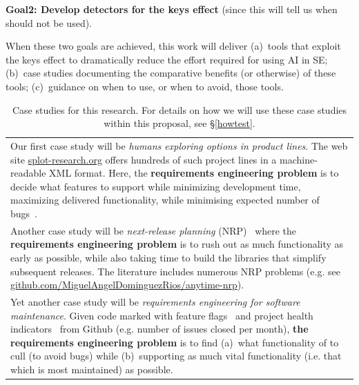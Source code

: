 \begin{center}
{\bf Goal2: Develop
detectors for the keys effect}  (since this  will tell us when
{\IT} should not be used). 
\end{center}
\noindent
When these two goals are achieved, this  work will deliver
   (a)~tools that   exploit  the  keys  effect  to dramatically
  reduce the effort required for using AI in SE; (b)~case  studies    documenting  the  comparative  benefits  (or  otherwise)  of  these tools; (c)~guidance on when to use, or when to avoid, those tools.
  
   
 
  
  
\begin{table}[!t]
  \caption{Case studies for this research.
  For details on how we will use these case studies within
  this proposal, see  \S\ref{howtest}. 
   }\label{casestudies}
{\small
\begin{tabular}{|p{}|}\hline
 \rowcolor{blue!10} Our first case study will be 
 {\em humans exploring options in product lines}. The web site \url{splot-research.org} offers hundreds of such project lines in a machine-readable XML format. 
 Here, the
 {\bf requirements engineering problem} is to decide what features to support while minimizing development time, maximizing delivered
 functionality, while minimising expected number of bugs~\cite{Sayyad:2013:SPL,Sayyad:2013,henard2015combining}.\\
 
 Another case study will be
   {\em next-release planning} (NRP)~\cite{Aydemir18,pitangueira2017minimizing,Ameller17,dominguez2019efficient} where the 
 {\bf requirements engineering
 problem} is to rush out as much functionality as early as possible, while also taking time
 to build the libraries that simplify subsequent releases.
The literature includes numerous  NRP problems
 (e.g. see \url{github.com/MiguelAngelDominguezRios/anytime-nrp}).\\
 
\rowcolor{blue!10} Yet another case study will be {\em requirements
 engineering for software maintenance}.
 Given   code marked   with feature flags~\cite{parnin2017top,rahman2016feature}
 and project health indicators~\cite{xia2020predicting}
 from Github (e.g. number of issues closed per month), 
 {\bf the requirements engineering 
    problem} is to find
  (a)~what functionality of 
 to cull (to avoid bugs) while (b)~supporting as much  
 vital functionality (i.e. that which is most maintained) as possible.\\
 

\end{tabular}}
\end{table}
